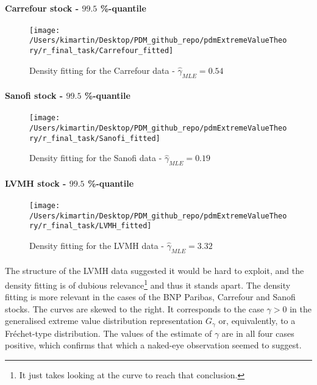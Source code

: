 \paragraph{Carrefour stock - $99.5$ \%-quantile}
\begin{figure}[h!]
	\centering
	\texttt{[image: /Users/kimartin/Desktop/PDM\_github\_repo/pdmExtremeValueTheory/r\_final\_task/Carrefour\_fitted]}
	\caption{Density fitting for the Carrefour data - $\hat{\gamma}_{MLE} = 0.54$ \\}
	\label{fig:dataAboveThresholdCarrefourFitted}
\end{figure}
\clearpage
\paragraph{Sanofi stock - $99.5$ \%-quantile}
\begin{figure}[h!]
	\centering
	\texttt{[image: /Users/kimartin/Desktop/PDM\_github\_repo/pdmExtremeValueTheory/r\_final\_task/Sanofi\_fitted]}
	\caption{Density fitting for the Sanofi data - $\hat{\gamma}_{MLE} = 0.19$}
	\label{fig:dataAboveThresholdSanofiFitted}
\end{figure}
\paragraph{LVMH stock - $99.5$ \%-quantile}
\begin{figure}[h!]
	\centering
	\texttt{[image: /Users/kimartin/Desktop/PDM\_github\_repo/pdmExtremeValueTheory/r\_final\_task/LVMH\_fitted]}
	\caption{Density fitting for the LVMH data - $\hat{\gamma}_{MLE} = 3.32$}
	\label{fig:dataAboveThresholdLVMHFitted}
\end{figure}
\paragraph{}
The structure of the LVMH data suggested it would be hard to exploit, and the density fitting is of dubious relevance\footnote{It just takes looking at the curve to reach that conclusion.} and thus it stands apart. The density fitting is more relevant in the cases of the BNP Paribas, Carrefour and Sanofi stocks. The curves are skewed to the right. It corresponds to the case $\gamma > 0$ in the generalised extreme value distribution representation $G_\gamma$ or, equivalently, to a Fréchet-type distribution. The values of the estimate of $\gamma$ are in all four cases positive, which confirms that which a naked-eye observation seemed to suggest.
\clearpage

